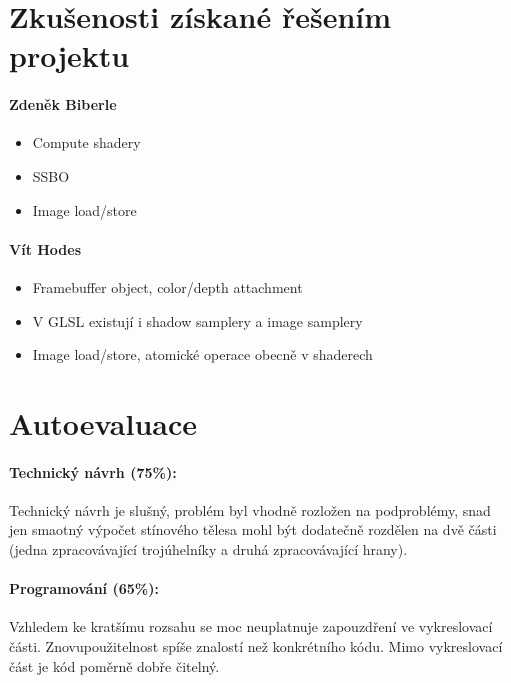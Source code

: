 \documentclass[11pt,a4paper]{article}
\begin{document}
\section{Zkušenosti získané řešením projektu}

\paragraph{Zdeněk Biberle}
\begin{itemize}
	\item Compute shadery
	\item SSBO
	\item Image load/store
\end{itemize}

\paragraph{Vít Hodes}
\begin{itemize}
	\item Framebuffer object, color/depth attachment
	\item V GLSL existují i shadow samplery a image samplery
	\item Image load/store, atomické operace obecně v shaderech
	
\end{itemize}

\section{Autoevaluace}

\paragraph{Technický návrh (75\%):}
Technický návrh je slušný, problém byl vhodně rozložen na podproblémy, snad jen smaotný výpočet stínového tělesa mohl být dodatečně rozdělen na dvě části (jedna zpracovávající trojúhelníky a druhá zpracovávající hrany).


\paragraph{Programování (65\%):} 
Vzhledem ke kratšímu rozsahu se moc neuplatnuje zapouzdření ve vykreslovací části. Znovupoužitelnost
spíše znalostí než konkrétního kódu. Mimo vykreslovací část je kód poměrně dobře čitelný.
\end{document}
